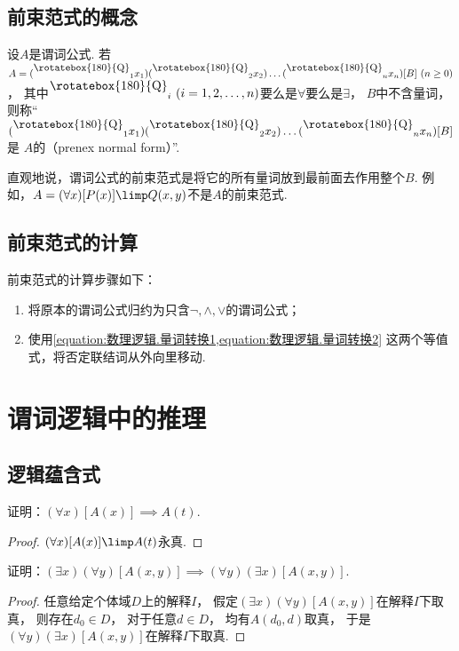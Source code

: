 \subsection{前束范式的概念}
\begin{definition}
设\(A\)是谓词公式.
\def\Q{\raisebox{.6em}{\rotatebox{180}{Q}}}
若\(A = (\Q_1 x_1)(\Q_2 x_2)\dotso(\Q_n x_n)[B]\ (n\geq0)\)，
其中\(\Q_i\ (i=1,2,\dotsc,n)\)要么是\(\forall\)要么是\(\exists\)，
\(B\)中不含量词，
则称“\((\Q_1 x_1)(\Q_2 x_2)\dotso(\Q_n x_n)[B]\)是
\(A\)的（prenex normal form）”.
\end{definition}

直观地说，谓词公式的前束范式是将它的所有量词放到最前面去作用整个\(B\).
例如，\(A = (\forall x)[P(x)] \limp Q(x,y)\)不是\(A\)的前束范式.

\subsection{前束范式的计算}
前束范式的计算步骤如下：\begin{enumerate}
	\item 将原本的谓词公式归约为只含\(\neg,\land,\lor\)的谓词公式；
	\item 使用\cref{equation:数理逻辑.量词转换1,equation:数理逻辑.量词转换2}
	这两个等值式，将否定联结词从外向里移动.
\end{enumerate}

\section{谓词逻辑中的推理}
\subsection{逻辑蕴含式}
\begin{example}
证明：\((\forall x)[A(x)] \implies A(t)\).
\begin{proof}
\((\forall x)[A(x)] \limp A(t)\)永真.
\end{proof}
\end{example}

\begin{example}
证明：\((\exists x)(\forall y)[A(x,y)] \implies (\forall y)(\exists x)[A(x,y)]\).
\begin{proof}
任意给定个体域\(D\)上的解释\(I\)，
假定\((\exists x)(\forall y)[A(x,y)]\)在解释\(I\)下取真，
则存在\(d_0 \in D\)，
对于任意\(d \in D\)，
均有\(A(d_0,d)\)取真，
于是\((\forall y)(\exists x)[A(x,y)]\)在解释\(I\)下取真.
\end{proof}
\end{example}

